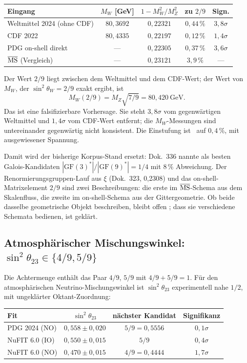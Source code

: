 \begin{center}
\small\begin{tabular}{@{}lcccc@{}}
\toprule
Eingang & $M_W$ [GeV] & $1-M_W^2/M_Z^2$ & zu $2/9$ & Sign. \\
\midrule
Weltmittel 2024 (ohne CDF) & $80{,}3692$ & $0{,}22321$ & $0{,}44\,\%$ & $3{,}8\sigma$ \\
CDF 2022 & $80{,}4335$ & $0{,}22197$ & $0{,}12\,\%$ & $1{,}4\sigma$ \\
PDG on-shell direkt & --- & $0{,}22305$ & $0{,}37\,\%$ & $3{,}6\sigma$ \\
$\overline{\rm MS}$ (Vergleich) & --- & $0{,}23121$ & $3{,}9\,\%$ & --- \\
\bottomrule
\end{tabular}
\end{center}

Der Wert $2/9$ liegt zwischen dem Weltmittel und dem CDF-Wert; der Wert von
$M_W$, der $\sin^2\theta_W = 2/9$ exakt ergibt, ist
\[
  M_W(2/9) = M_Z\sqrt{7/9} = 80{,}420\ \text{GeV}.
\]
Das ist eine falsifizierbare Vorhersage. Sie steht $3{,}8\sigma$ vom
gegenwärtigen Weltmittel und $1{,}4\sigma$ vom CDF-Wert entfernt; die
$M_W$-Messungen sind untereinander gegenwärtig nicht konsistent. Die
Einstufung ist \KM~auf $0{,}4\,\%$, mit ausgewiesener Spannung.

Damit wird der bisherige Korpus-Stand ersetzt: Dok.~336 nannte als besten
Galois-Kandidaten $|\mathrm{GF}(3)^*|/|\mathrm{GF}(9)^*| = 1/4$ mit $8\,\%$
Abweichung. Der Renormierungsgruppen-Lauf aus $\xi$ (Dok.~323, 0{,}2308) und
das on-shell-Matrixelement $2/9$ sind zwei Beschreibungen: die erste im
$\overline{\rm MS}$-Schema aus dem Skalenfluss, die zweite im on-shell-Schema
aus der Gittergeometrie. Ob beide dasselbe geometrische Objekt beschreiben,
bleibt offen \SM; dass sie verschiedene Schemata bedienen, ist geklärt.

\subsection{Atmosphärischer Mischungswinkel: \texorpdfstring{$\sin^2\theta_{23}\in\{4/9,5/9\}$}{sin2 theta23 in \{4/9, 5/9\}} \KM}

Die Achtermenge enthält das Paar $4/9$, $5/9$ mit $4/9+5/9 = 1$. Für den
atmosphärischen Neutrino-Mischungswinkel ist $\sin^2\theta_{23}$ experimentell
nahe $1/2$, mit ungeklärter Oktant-Zuordnung:

\begin{center}
\begin{tabular}{@{}lccc@{}}
\toprule
Fit & $\sin^2\theta_{23}$ & nächster Kandidat & Signifikanz \\
\midrule
PDG 2024 (NO) & $0{,}558\pm0{,}020$ & $5/9 = 0{,}5556$ & $0{,}1\sigma$ \\
NuFIT 6.0 (IO) & $0{,}550\pm0{,}015$ & $5/9$ & $0{,}4\sigma$ \\
NuFIT 6.0 (NO) & $0{,}470\pm0{,}015$ & $4/9 = 0{,}4444$ & $1{,}7\sigma$ \\
\bottomrule
\end{tabular}
\end{center}

